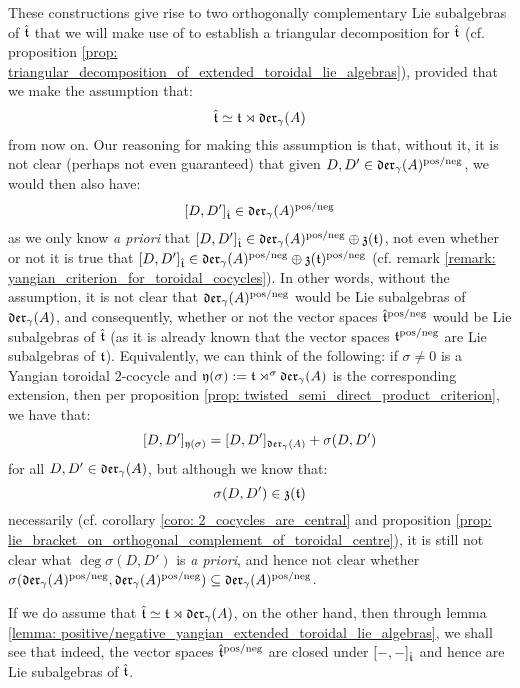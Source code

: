         \begin{remark}[Why must we work only with $\extendedtoroidal := \toroidal \rtimes \divzero$ ?] \label{remark: why_yangian_toroidal_semi_direct_product}
            These constructions give rise to two orthogonally complementary Lie subalgebras of $\hat{\mathfrak{t}}$ that we will make use of to establish a triangular decomposition for $\hat{\mathfrak{t}}$ (cf. proposition \ref{prop: triangular_decomposition_of_extended_toroidal_lie_algebras}), provided that we make the assumption that:
                $$\hat{\mathfrak{t}} \simeq \mathfrak{t} \rtimes \mathfrak{der}_{\gamma}(A)$$
            from now on. Our reasoning for making this assumption is that, without it, it is not clear (perhaps not even guaranteed) that given $D, D' \in \mathfrak{der}_{\gamma}(A)^{\mathrm{pos}/\mathrm{neg}}$, we would then also have:
                $$[D, D']_{\hat{\mathfrak{t}}} \in \mathfrak{der}_{\gamma}(A)^{\mathrm{pos}/\mathrm{neg}}$$
            as we only know \textit{a priori} that $[D, D']_{\hat{\mathfrak{t}}} \in \mathfrak{der}_{\gamma}(A)^{\mathrm{pos}/\mathrm{neg}} \oplus \mathfrak{z}(\mathfrak{t})$, not even whether or not it is true that $[D, D']_{\hat{\mathfrak{t}}} \in \mathfrak{der}_{\gamma}(A)^{\mathrm{pos}/\mathrm{neg}} \oplus \mathfrak{z}(\mathfrak{t})^{\mathrm{pos}/\mathrm{neg}}$ (cf. remark \ref{remark: yangian_criterion_for_toroidal_cocycles}). In other words, without the assumption, it is not clear that $\mathfrak{der}_{\gamma}(A)^{\mathrm{pos}/\mathrm{neg}}$ would be Lie subalgebras of $\mathfrak{der}_{\gamma}(A)$, and consequently, whether or not the vector spaces $\hat{\mathfrak{t}}^{\mathrm{pos}/\mathrm{neg}}$ would be Lie subalgebras of $\hat{\mathfrak{t}}$ (as it is already known that the vector spaces $\mathfrak{t}^{\mathrm{pos}/\mathrm{neg}}$ are Lie subalgebras of $\mathfrak{t}$). Equivalently, we can think of the following: if $\sigma \not = 0$ is a Yangian toroidal $2$-cocycle and $\mathfrak{y}(\sigma) := \mathfrak{t} \rtimes^{\sigma} \mathfrak{der}_{\gamma}(A)$ is the corresponding extension, then per proposition \ref{prop: twisted_semi_direct_product_criterion}, we have that:
                $$[D, D']_{\mathfrak{y}(\sigma)} = [D, D']_{\mathfrak{der}_{\gamma}(A)} + \sigma(D, D')$$
            for all $D, D' \in \mathfrak{der}_{\gamma}(A)$, but although we know that:
                $$\sigma(D, D') \in \mathfrak{z}(\mathfrak{t})$$
            necessarily (cf. corollary \ref{coro: 2_cocycles_are_central} and proposition \ref{prop: lie_bracket_on_orthogonal_complement_of_toroidal_centre}), it is still not clear what $\deg \sigma(D, D')$ is \textit{a priori}, and hence not clear whether $\sigma(\mathfrak{der}_{\gamma}(A)^{\mathrm{pos}/\mathrm{neg}}, \mathfrak{der}_{\gamma}(A)^{\mathrm{pos}/\mathrm{neg}}) \subseteq \mathfrak{der}_{\gamma}(A)^{\mathrm{pos}/\mathrm{neg}}$.
            
            If we do assume that $\hat{\mathfrak{t}} \simeq \mathfrak{t} \rtimes \mathfrak{der}_{\gamma}(A)$, on the other hand, then through lemma \ref{lemma: positive/negative_yangian_extended_toroidal_lie_algebras}, we shall see that indeed, the vector spaces $\hat{\mathfrak{t}}^{\mathrm{pos}/\mathrm{neg}}$ are closed under $[-, -]_{\hat{\mathfrak{t}}}$ and hence are Lie subalgebras of $\hat{\mathfrak{t}}$. 
        \end{remark}
        
